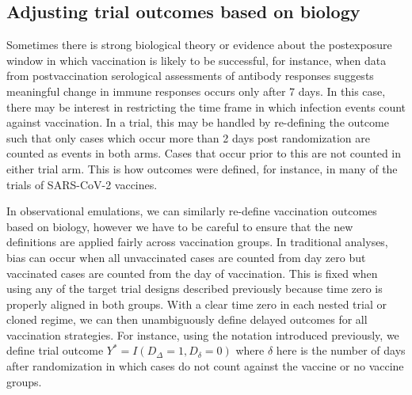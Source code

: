 \begin{appendices}
\begin{refsection}
    \subsection{Adjusting trial outcomes based on biology} \label{sec:delayed_followup}
    Sometimes there is strong biological theory or evidence about the postexposure window in which vaccination is likely to be successful, for instance, when data from postvaccination serological assessments of antibody responses suggests meaningful change in immune responses occurs only after 7 days. In this case, there may be interest in restricting the time frame in which infection events count against vaccination. In a trial, this may be handled by re-defining the outcome such that only cases which occur more than 2 days post randomization are counted as events in both arms. Cases that occur prior to this are not counted in either trial arm. This is how outcomes were defined, for instance, in many of the trials of SARS-CoV-2 vaccines. 
        
    In observational emulations, we can similarly re-define vaccination outcomes based on biology, however we have to be careful to ensure that the new definitions are applied fairly across vaccination groups. In traditional analyses, bias can occur when all unvaccinated cases are counted from day zero but vaccinated cases are counted from the day of vaccination. This is fixed when using any of the target trial designs described previously because time zero is properly aligned in both groups. With a clear time zero in each nested trial or cloned regime, we can then unambiguously define delayed outcomes for all vaccination strategies. For instance, using the notation introduced previously, we define trial outcome $Y^* = I(D_{\Delta} = 1, D_{\delta} = 0)$ where $\delta$ here is the number of days after randomization in which cases do not count against the vaccine or no vaccine groups.

    \clearpage

\end{refsection}
\end{appendices}
